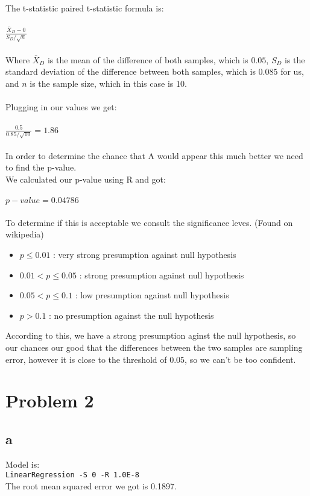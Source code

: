 \documentclass{article}
\begin{document}
The t-statistic paired t-statistic formula is:\\\\
$\frac{\bar{X}_{D} - 0}{S_{D}/\sqrt{n}}$\\\\
Where  $\bar{X}_{D}$ is the mean of the difference of both samples, which is $0.05$, $S_{D}$ is the standard deviation of the difference between both samples, which is $0.085$ for us, and $n$ is the sample size, which in this case is 10.\\\\
Plugging in our values we get:\\\\
$\frac{0.5}{0.85/\sqrt{10}} = 1.86$\\\\
In order to determine the chance that A would appear this much better we need to find the p-value.\\
We calculated our p-value using R and got:\\\\
$p-value = 0.04786$\\\\
To determine if this is acceptable we consult the significance leves. (Found on wikipedia)\\
\begin{itemize}
 \item $p \leq 0.01$  : very strong presumption against null hypothesis\\
 \item $0.01 < p \leq 0.05$  : strong presumption against null hypothesis\\
 \item $0.05 < p \leq 0.1$ : low presumption against null hypothesis\\
 \item $p > 0.1$ : no presumption against the null hypothesis\\
\end{itemize}
According to this, we have a strong presumption aginst the null hypothesis, so our chances our good that the differences between the two samples are sampling error, however it is close to the threshold of 0.05, so we can't be too confident.\\
\section*{Problem 2}
\subsection*{a}
Model is:\\
\verb|LinearRegression -S 0 -R 1.0E-8|\\
The root mean squared error we got is 0.1897.\\
\end{document}
